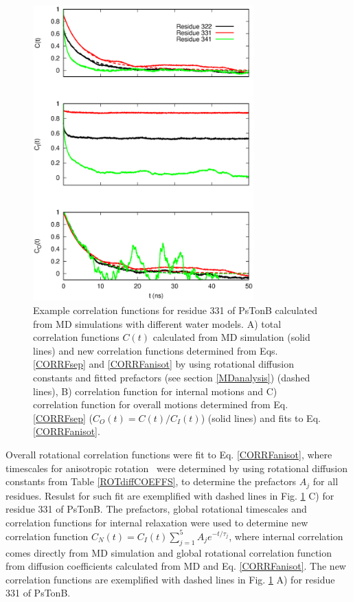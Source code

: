 \documentclass[pre,aps,floatfix,authordate1-4,twocolumn]{revtex4-1}
\begin{document}
\begin{figure}[!h]
  \includegraphics[width=8.5cm]{../Figs/exampleCORRF2.eps}%
  \caption{Example correlation functions for residue 331 of PsTonB calculated from MD simulations with different water models.
    A) total correlation functions $C(t)$ calculated from MD simulation (solid lines) and
    new correlation functions determined from Eqs. \ref{CORRFsep} and \ref{CORRFanisot} by
    using rotational diffusion constants and fitted prefactors (see section \ref{MDanalysis}) (dashed lines),
    B) correlation function for internal motions and %
    C) correlation function for overall motions determined from Eq. \ref{CORRFsep} ($C_O(t)=C(t)/C_I(t)$) (solid lines) and
    fits to Eq. \ref{CORRFanisot}.
    }\label{exampleCORRF}
\end{figure}

Overall rotational correlation functions were fit to Eq.  \ref{CORRFanisot}, where
timescales for anisotropic rotation~\cite{Note1} were determined by using rotational diffusion constants
from Table \ref{ROTdiffCOEFFS}, to determine the prefactors $A_j$ for all residues.
Resulst for such fit are exemplified with dashed lines in Fig. \ref{exampleCORRF} C) for residue 331 of PsTonB.
The prefactors, global rotational timescales and correlation functions for internal relaxation
were used to determine new correlation function $C_N(t)=C_I(t)\sum_{j=1}^5 A_j e^{-t/\tau_j}$,
where internal correlation comes directly from MD simulation and global rotational correlation
function from diffusion coefficients calculated from MD and Eq. \ref{CORRFanisot}. The new correlation
functions are exemplified with dashed lines in Fig. \ref{exampleCORRF} A) for residue 331 of PsTonB.
\end{document}
